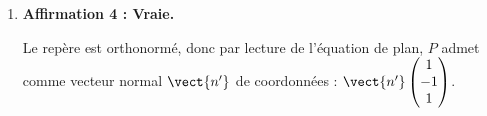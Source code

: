 \begin{enumerate}
	\[
	\begin{aligned}
		\begin{cases}
			15+k=1+4 s \\
			8-k=2+4 s \\
			-6+2 k=1-6 s
		\end{cases}
		&\iff \begin{cases}
			k=-14 + 4 s \\
			8-(-14 + 4 s)=2+4 s \\
			-6+2(- 14 + 4 s)=1-6 s
		\end{cases}\\
		&\iff \begin{cases}
			k=-14+4 s \\
			8+14-4 s=2+4 s \\
			-6-28+8 s=1-6 s
		\end{cases}\\
		&\iff \begin{cases}
			k=-14+4 s \\
			8 s=20 \\
			14 s=35
		\end{cases}\\
		&\iff \begin{cases}
			k=-14+4 s \\
			s=\frac{20}{8}=\frac{5}{2} \\
			s=\frac{35}{14}=\frac{5}{2}
		\end{cases}\\
		&\iff \begin{cases}
			s=2,5 \\
			s=2,5 \\
			k=-4
		\end{cases}
	\end{aligned}
	\]

	Le système a une solution, donc les deux droites ont un point commun, le point qui a comme coordonnées $(11 ~;~ 12 ~;~ -14)$, c'est le point de paramètre $k = -4$ sur $d$ et c'est aussi le point de paramètre $s = 2,5$ sur $d'$.

	Elles sont donc sécantes en ce point, et donc sont coplanaires.

	\item \textbf{Affirmation 4 : Vraie.}

	Le repère est orthonormé, donc par lecture de l'équation de plan, $P$ admet comme vecteur normal $\vect{n'}$ de coordonnées : \quad$\vect{n'} \begin{pmatrix} 1\\-1\\1	\end{pmatrix}$.


\end{enumerate}
